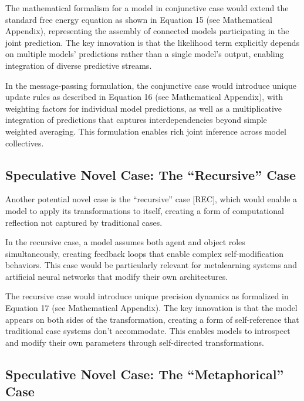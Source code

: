 \documentclass[
]{book}
\begin{document}
The mathematical formalism for a model in conjunctive case would extend
the standard free energy equation as shown in Equation 15 (see
Mathematical Appendix), representing the assembly of connected models
participating in the joint prediction. The key innovation is that the
likelihood term explicitly depends on multiple models' predictions
rather than a single model's output, enabling integration of diverse
predictive streams.

In the message-passing formulation, the conjunctive case would introduce
unique update rules as described in Equation 16 (see Mathematical
Appendix), with weighting factors for individual model predictions, as
well as a multiplicative integration of predictions that captures
interdependencies beyond simple weighted averaging. This formulation
enables rich joint inference across model collectives.

\hypertarget{speculative-novel-case-the-recursive-case}{%
\subsection{Speculative Novel Case: The ``Recursive''
Case}\label{speculative-novel-case-the-recursive-case}}

Another potential novel case is the ``recursive'' case {[}REC{]}, which
would enable a model to apply its transformations to itself, creating a
form of computational reflection not captured by traditional cases.

In the recursive case, a model assumes both agent and object roles
simultaneously, creating feedback loops that enable complex
self-modification behaviors. This case would be particularly relevant
for metalearning systems and artificial neural networks that modify
their own architectures.

The recursive case would introduce unique precision dynamics as
formalized in Equation 17 (see Mathematical Appendix). The key
innovation is that the model appears on both sides of the
transformation, creating a form of self-reference that traditional case
systems don't accommodate. This enables models to introspect and modify
their own parameters through self-directed transformations.

\hypertarget{speculative-novel-case-the-metaphorical-case}{%
\subsection{Speculative Novel Case: The ``Metaphorical''
Case}\label{speculative-novel-case-the-metaphorical-case}}
\end{document}
